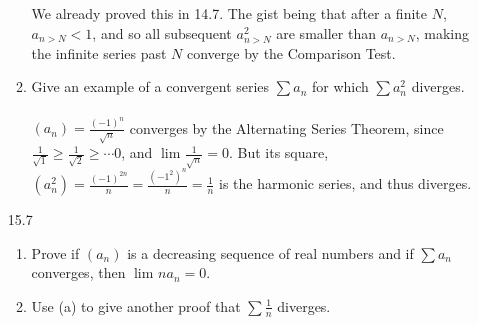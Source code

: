 \begin{enumerate}
\begin{enumerate}
        We already proved this in 14.7. The gist being that after a finite $N$, $a_{n > N} < 1$, and so all subsequent $a_{n>N}^2$ are smaller than $a_{n>N}$, making the infinite series past $N$ converge by the Comparison Test.\\

      \item Give an example of a convergent series $\sum a_n$ for which $\sum a_n^2$ diverges.\\\\

        $(a_n) = \frac{(-1)^n}{\sqrt{n}}$ converges by the Alternating Series Theorem, since $\frac{1}{\sqrt{1}} \geq \frac{1}{\sqrt{2}} \geq \cdots 0$, and $\lim_{} \frac{1}{\sqrt{n}} = 0$. But its square, $(a_n^2) = \frac{(-1)^{2n}}{n} = \frac{(-1^2)^n}{n} = \frac{1}{n}$ is the harmonic series, and thus diverges.
    \end{enumerate}    
  \item [15.7]
    \begin{enumerate}
      \item Prove if $(a_n)$ is a decreasing sequence of real numbers and if $\sum a_n$ converges, then $\lim_{} n a_n = 0$.
      \item Use (a) to give another proof that $\sum \frac{1}{n}$ diverges.
    \end{enumerate}
\end{enumerate}


